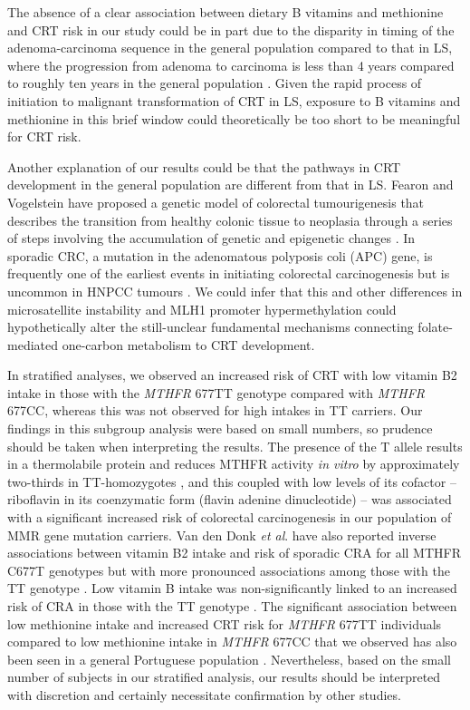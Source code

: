 \noindent The absence of a clear association between dietary B vitamins and methionine and CRT risk in our study could be in part due to the disparity in timing of the adenoma-carcinoma sequence in the general population compared to that in LS, where the progression from adenoma to carcinoma is less than 4 years \cite{c610,c644} compared to roughly ten years in the general population \cite{c645}. Given the rapid process of initiation to malignant transformation of CRT in LS, exposure to B vitamins and methionine in this brief window could theoretically be too short to be meaningful for CRT risk.

\noindent Another explanation of our results could be that the pathways in CRT development in the general population are different from that in LS. Fearon and Vogelstein have proposed a genetic model of colorectal tumourigenesis that describes the transition from healthy colonic tissue to neoplasia through a series of steps involving the accumulation of genetic and epigenetic changes \cite{c68}. In sporadic CRC, a mutation in the adenomatous polyposis coli (APC) gene, is frequently one of the earliest events in initiating colorectal carcinogenesis \cite{c646} but is uncommon in HNPCC tumours \cite{c647}. We could infer that this and other differences in microsatellite instability and MLH1 promoter hypermethylation could hypothetically alter the still-unclear fundamental mechanisms connecting folate-mediated one-carbon metabolism to CRT development.

\noindent In stratified analyses, we observed an increased risk of CRT with low vitamin B2 intake in those with the \emph{MTHFR} 677TT genotype compared with \emph{MTHFR} 677CC, whereas this was not observed for high intakes in TT carriers. Our findings in this subgroup analysis were based on small numbers, so prudence should be taken when interpreting the results. The presence of the T allele results in a thermolabile protein and reduces MTHFR activity \emph{in vitro} by approximately two-thirds in TT-homozygotes \cite{c648}, and this coupled with low levels of its cofactor -- riboflavin in its coenzymatic form (flavin adenine dinucleotide) -- was associated with a significant increased risk of colorectal carcinogenesis in our population of MMR gene mutation carriers. Van den Donk \emph{et al}. have also reported inverse associations between vitamin B2 intake and risk of sporadic CRA for all MTHFR C677T genotypes but with more pronounced associations among those with the TT genotype \cite{c621}. Low vitamin 
B intake was non-significantly linked to an increased risk of CRA in those with the TT genotype \cite{c621}. The significant association between low methionine intake and increased CRT risk for \emph{MTHFR} 677TT individuals compared to low methionine intake in \emph{MTHFR} 677CC that we observed has also been seen in a general Portuguese population \cite{c649}. Nevertheless, based on the small number of subjects in our stratified analysis, our results should be interpreted with discretion and certainly necessitate confirmation by other studies.

